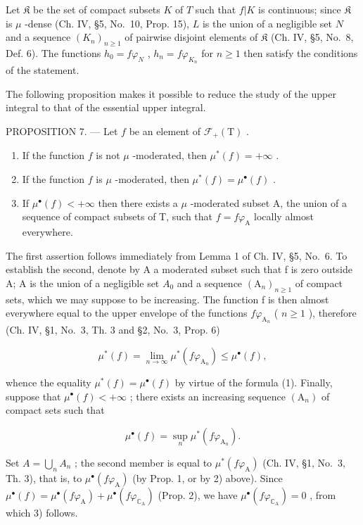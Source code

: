 Let \(\mathfrak{K}\) be the set of compact subsets \(K\) of \(T\) such that \(f|K\) is continuous; since \(\mathfrak{K}\) is \(\mu\) -dense (Ch. IV, §5, No.~10, Prop. 15), \(L\) is the union of a negligible set \(N\) and a sequence \((K_n)_{n \geqslant 1}\) of pairwise disjoint elements of \(\mathfrak{K}\) (Ch. IV, §5, No.~8, Def. 6). The functions \(h_0 = f\varphi_N\) , \(h_n = f\varphi_{K_n}\) for \(n \geqslant 1\) then satisfy the conditions of the statement.

The following proposition makes it possible to reduce the study of the upper integral to that of the essential upper integral.

PROPOSITION 7. --- Let \(f\) be an element of \(\mathcal{F}_{+}(\mathrm{T})\) .

\begin{enumerate}
\def\labelenumi{\arabic{enumi})}
\item
  If the function \(f\) is not \(\mu\) -moderated, then \(\mu^{*}(f) = +\infty\) .
\item
  If the function \(f\) is \(\mu\) -moderated, then \(\mu^{*}(f) = \mu^{\bullet}(f)\) .
\item
  If \(\mu^{\bullet}(f) < +\infty\) then there exists a \(\mu\) -moderated subset A, the union of a sequence of compact subsets of T, such that \(f = f\varphi_{\mathrm{A}}\) locally almost everywhere.
\end{enumerate}

The first assertion follows immediately from Lemma 1 of Ch. IV, §5, No.~6. To establish the second, denote by A a moderated subset such that f is zero outside A; A is the union of a negligible set \(A_{0}\) and a sequence \((\mathrm{A}_{n})_{n\geqslant1}\) of compact sets, which we may suppose to be increasing. The function f is then almost everywhere equal to the upper envelope of the functions \(f\varphi_{\mathrm{A}_{n}}\) ( \(n\geqslant1\) ), therefore (Ch. IV, §1, No.~3, Th. 3 and §2, No.~3, Prop. 6)

\[
\mu^ {*} (f) = \lim _ {n \rightarrow \infty} \mu^ {*} (f \varphi_ {\mathrm{A} _ {n}}) \leqslant \mu^ {\bullet} (f),
\]

whence the equality \(\mu^{*}(f)=\mu^{\bullet}(f)\) by virtue of the formula (1). Finally, suppose that \(\mu^{\bullet}(f)<+\infty\) ; there exists an increasing sequence \((\mathrm{A}_{n})\) of compact sets such that

\[
\mu^ {\bullet} (f) = \sup _ {n} \mu^ {*} (f \varphi_ {\mathrm{A} _ {n}}).
\]

Set \(A = \bigcup_{n} A_{n}\) ; the second member is equal to \(\mu^{*}(f\varphi_{\mathrm{A}})\) (Ch. IV, §1, No.~3, Th. 3), that is, to \(\mu^{\bullet}(f\varphi_{\mathrm{A}})\) (by Prop. 1, or by 2) above). Since \(\mu^{\bullet}(f) = \mu^{\bullet}(f\varphi_{\mathrm{A}}) + \mu^{\bullet}(f\varphi_{\mathbb{C}_{\mathrm{A}}})\) (Prop. 2), we have \(\mu^{\bullet}(f\varphi_{\mathbb{C}_{\mathrm{A}}}) = 0\) , from which 3) follows.

